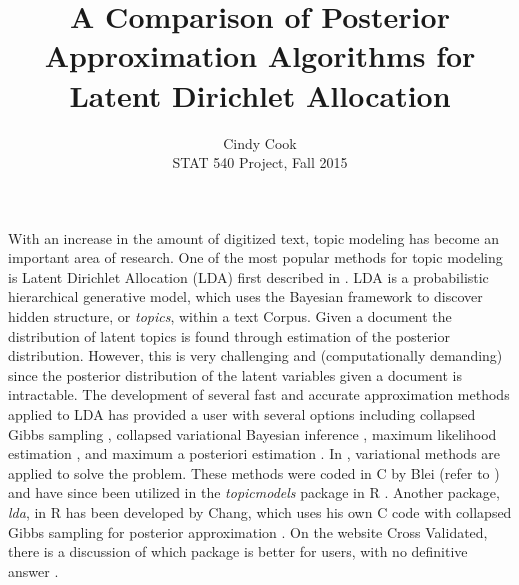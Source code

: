 \documentclass[12pt]{article}
\begin{document}
	
\title{A Comparison of Posterior Approximation Algorithms for Latent Dirichlet Allocation} 
         
\author{Cindy Cook \\ STAT 540 Project, Fall 2015}
\date{}
\maketitle
\vspace{-12mm}
With an increase in the amount of digitized text, topic modeling has become an important area of research. One of the most popular methods for topic modeling is Latent Dirichlet Allocation (LDA) first described in \cite{lda}. LDA is a probabilistic hierarchical generative model, which uses the Bayesian framework to discover hidden structure, or \textit{topics},  within a text Corpus. Given a document the distribution of latent topics is found through estimation of the posterior distribution. However, this is very challenging and (computationally demanding) since the posterior distribution of the latent variables given a document is intractable. The development of several fast and accurate approximation methods applied to LDA has provided a user with several options including collapsed Gibbs sampling \cite{CGS}, collapsed variational Bayesian inference \cite{CVB}, maximum likelihood estimation \cite{ML}, and maximum a posteriori estimation \cite{MAP}. In \cite{lda}, variational methods are applied to solve the problem. These methods were coded in C by Blei (refer to \cite{Ccode}) and have since been utilized in the \textit{topicmodels} package in R \cite{topicsR}. Another package, \textit{lda}, in R has been developed by Chang, which uses his own C code with collapsed Gibbs sampling for posterior approximation \cite{ldaR}. On the website Cross Validated, there is a discussion of which package is better for users, with no definitive answer \cite{STACK}.
\par
\end{document}
